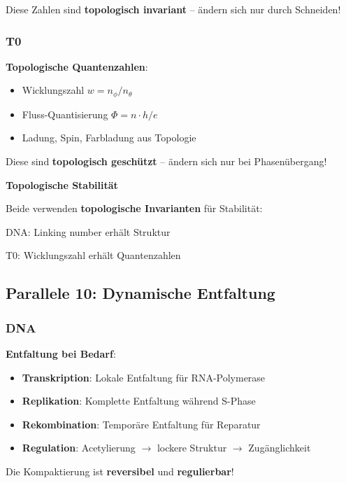	Diese Zahlen sind \textbf{topologisch invariant} -- ändern sich nur durch Schneiden!
	
	\subsubsection{T0}
	
	\textbf{Topologische Quantenzahlen}:
	\begin{itemize}
		\item Wicklungszahl $w = n_\phi / n_\theta$
		\item Fluss-Quantisierung $\Phi = n \cdot h/e$
		\item Ladung, Spin, Farbladung aus Topologie
	\end{itemize}
	
	Diese sind \textbf{topologisch geschützt} -- ändern sich nur bei Phasenübergang!
	
	\begin{keyresult}
		\textbf{Topologische Stabilität}
		
		Beide verwenden \textbf{topologische Invarianten} für Stabilität:
		
		DNA: Linking number erhält Struktur
		
		T0: Wicklungszahl erhält Quantenzahlen
	\end{keyresult}
	
	\subsection{Parallele 10: Dynamische Entfaltung}
	
	\subsubsection{DNA}
	
	\textbf{Entfaltung bei Bedarf}:
	
	\begin{itemize}
		\item \textbf{Transkription}: Lokale Entfaltung für RNA-Polymerase
		\item \textbf{Replikation}: Komplette Entfaltung während S-Phase
		\item \textbf{Rekombination}: Temporäre Entfaltung für Reparatur
		\item \textbf{Regulation}: Acetylierung $\to$ lockere Struktur $\to$ Zugänglichkeit
	\end{itemize}
	
	Die Kompaktierung ist \textbf{reversibel} und \textbf{regulierbar}!
	
